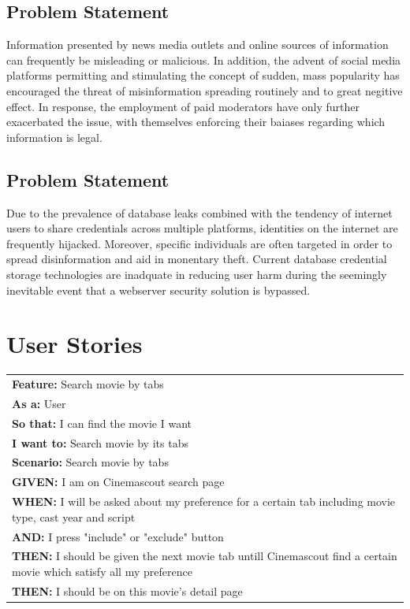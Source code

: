 \documentclass{article}
\begin{document}
\subsection{Problem Statement}
Information presented by news media outlets and online sources of information
can frequently be misleading or malicious. In addition, the advent of social
media platforms permitting and stimulating the concept of sudden, mass 
popularity has encouraged the threat of misinformation spreading routinely and
to great negitive effect. In response, the employment of paid moderators have
only further exacerbated the issue, with themselves enforcing their baiases
regarding which information is legal.
\subsection{Problem Statement}
Due to the prevalence of database leaks combined with the tendency of internet
users to share credentials across multiple platforms, identities on the internet
are frequently hijacked. Moreover, specific individuals are often targeted in
order to spread disinformation and aid in monentary theft. Current database
credential storage technologies are inadquate in reducing user harm during the
seemingly inevitable event that a webserver security solution is bypassed.


\section{User Stories}
\begin{table}[H]
\begin{tabular}{|l|}
\hline
\textbf{Feature:} Search movie by tabs   \\
\textbf{As a:} User\\
\textbf{So that:} I can find the movie I want\\
\textbf{I want to:} Search movie by its tabs\\
\textbf{Scenario:} Search movie by tabs\\
\textbf{GIVEN:} I am on Cinemascout search page\\
\textbf{WHEN:} I will be asked about my preference for a certain tab including movie type, cast year and script\\
\textbf{AND:} I press "include" or "exclude" button\\
\textbf{THEN:} I should be given the next movie tab untill Cinemascout find a certain movie which satisfy all my preference\\
\textbf{THEN:} I should be on this movie's detail page\\
\hline
\end{tabular}
\end{table}
\end{document}

